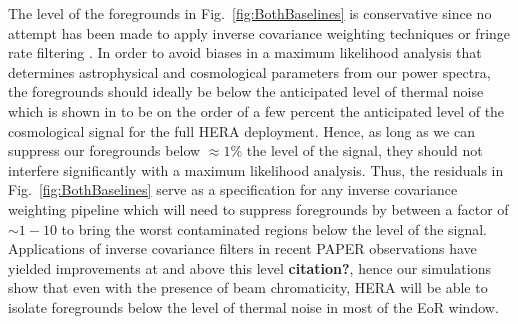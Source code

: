 \documentclass[twocolumn]{emulateapj}
\begin{document}
The level of the foregrounds in Fig.~\ref{fig:BothBaselines} is conservative since no attempt has been made to apply inverse covariance weighting techniques \citep{Tegmark:1997a,Liu:2011,Dillon:2013,Parsons:2014,Liu:2014a,Liu:2014b,Dillon:2015a,Dillon:2015b,Trott:2016} or fringe rate filtering \citep{Parsons:2015}. In order to avoid biases in a maximum likelihood analysis that determines astrophysical and cosmological parameters from our power spectra, the foregrounds should ideally be below the anticipated level of thermal noise which is shown in \citet{Pober:2014} to be on the order of a few percent the anticipated level of the cosmological signal for the full HERA deployment. Hence, as long as we can suppress our foregrounds below $\approx 1$\% the level of the signal, they should not interfere significantly with a maximum likelihood analysis. Thus, the residuals in Fig.~\ref{fig:BothBaselines} serve as a specification for any inverse covariance weighting pipeline which will need to suppress foregrounds by between a factor of $\sim 1-10$ to bring the worst contaminated regions below the level of the signal. Applications of inverse covariance filters in recent PAPER observations have yielded improvements at and above this level {\bf \color{red} citation?}, hence our simulations show that even with the presence of beam chromaticity, HERA will be able to isolate foregrounds below the level of thermal noise in most of the EoR window. 
\end{document}
